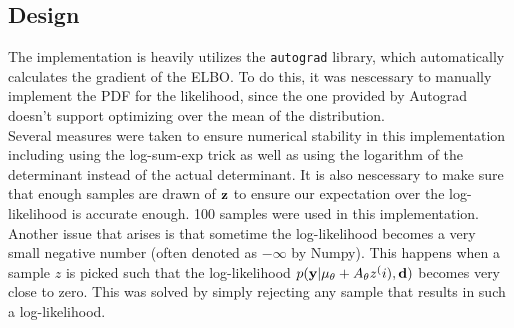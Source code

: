 \subsection{Design}
The implementation is heavily utilizes the \texttt{autograd} library, which automatically calculates the gradient of the ELBO.
To do this, it was nescessary to manually implement the PDF for the likelihood, since the one provided by Autograd doesn't support optimizing over the mean of the distribution.\\
Several measures were taken to ensure numerical stability in this implementation including using the log-sum-exp trick as well as using the logarithm of the determinant instead of the actual determinant.
It is also nescessary to make sure that enough samples are drawn of $\mathbf{z}$ to ensure our expectation over the log-likelihood is accurate enough. 100 samples were used in this implementation.
Another issue that arises is that sometime the log-likelihood becomes a very small negative number (often denoted as $-\infty$ by Numpy). This happens when a sample $z$ is picked such that the log-likelihood $p(\mathbf{y}| \mu_\theta + A_\theta z^(i), \mathbf{d})$ becomes very close to zero.
This was solved by simply rejecting any sample that results in such a log-likelihood.

